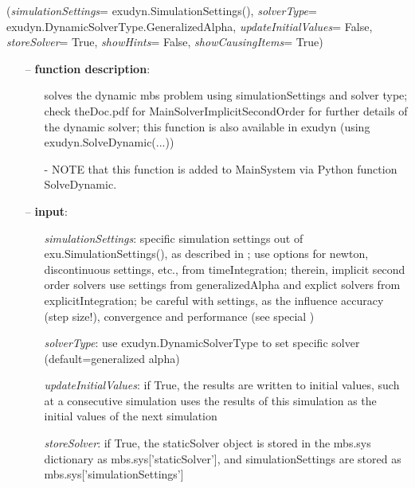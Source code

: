 \ei

%
\begin{flushleft}
\label{sec:mainsystemextensions:SolveDynamic}
({\it simulationSettings}= exudyn.SimulationSettings(), {\it solverType}= exudyn.DynamicSolverType.GeneralizedAlpha, {\it updateInitialValues}= False, {\it storeSolver}= True, {\it showHints}= False, {\it showCausingItems}= True)
\end{flushleft}
\setlength{\itemindent}{0.7cm}
\begin{itemize}[leftmargin=0.7cm]
\item[--]
{\bf function description}: \vspace{-6pt}
\begin{itemize}[leftmargin=1.2cm]
\setlength{\itemindent}{-0.7cm}
\item[]solves the dynamic mbs problem using simulationSettings and solver type; check theDoc.pdf for MainSolverImplicitSecondOrder for further details of the dynamic solver; this function is also available in exudyn (using exudyn.SolveDynamic(...))
\item[]- NOTE that this function is added to MainSystem via Python function SolveDynamic.
\end{itemize}
\item[--]
{\bf input}: \vspace{-6pt}
\begin{itemize}[leftmargin=1.2cm]
\setlength{\itemindent}{-0.7cm}
\item[]{\it simulationSettings}: specific simulation settings out of exu.SimulationSettings(), as described in ; use options for newton, discontinuous settings, etc., from timeIntegration; therein, implicit second order solvers use settings from generalizedAlpha and explict solvers from explicitIntegration; be careful with settings, as the influence accuracy (step size!), convergence and performance (see special )
\item[]{\it solverType}: use exudyn.DynamicSolverType to set specific solver (default=generalized alpha)
\item[]{\it updateInitialValues}: if True, the results are written to initial values, such at a consecutive simulation uses the results of this simulation as the initial values of the next simulation
\item[]{\it storeSolver}: if True, the staticSolver object is stored in the mbs.sys dictionary as mbs.sys['staticSolver'], and simulationSettings are stored as mbs.sys['simulationSettings']

\end{itemize}
\end{itemize}
